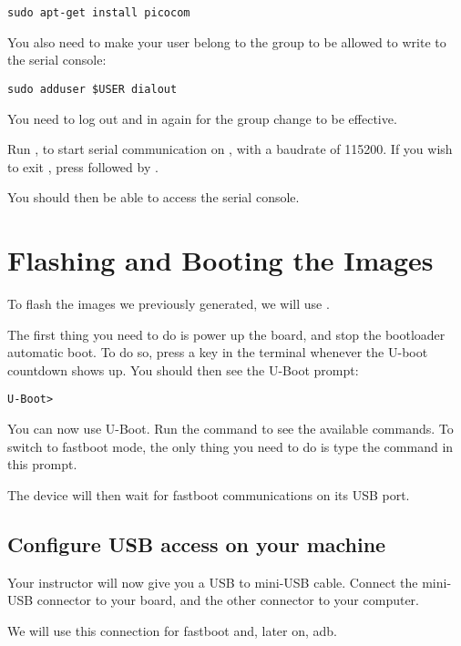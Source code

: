 \begin{verbatim}
sudo apt-get install picocom
\end{verbatim}

You also need to make your user belong to the  group to be
allowed to write to the serial console:

\begin{verbatim}
sudo adduser $USER dialout
\end{verbatim}

You need to log out and in again for the group change to be effective.

Run , to start serial
communication on , with a baudrate of 115200. If
you wish to exit , press \code{[Ctrl][a]} followed by
\code{[Ctrl][x]}.

You should then be able to access the serial console.

\section{Flashing and Booting the Images}

To flash the images we previously generated, we will use
.

The first thing you need to do is power up the board, and stop the
bootloader automatic boot. To do so, press a key in the 
terminal whenever the U-boot countdown shows up. You should then see
the U-Boot prompt:
\begin{verbatim}
U-Boot>
\end{verbatim}

You can now use U-Boot. Run the  command to see the
available commands. To switch to fastboot mode, the only thing you
need to do is type the command  in this prompt.

The device will then wait for fastboot communications on its USB port.

\subsection{Configure USB access on your machine}

Your instructor will now give you a USB to mini-USB cable. Connect
the mini-USB connector to your board, and the other connector to your
computer.

We will use this connection for fastboot and, later on, adb.

